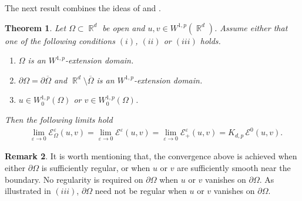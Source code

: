 \documentclass[12pt, reqno]{amsart}%
\theoremstyle{plain}  %
\newtheorem{theorem}{Theorem}[section]
\theoremstyle{definition}  %
\newtheorem{remark}[theorem]{Remark}   %
\numberwithin{equation}{section}
\DeclareMathOperator{\R}{\mathbb{R}}
\newcommand{\eps}{\varepsilon}
\begin{document}
\noindent The next result combines the ideas of \cite[Theorem 1.5]{Fog23} and \cite[Lemma 2.8]{FeSa20}.
\begin{theorem}\label{thm:BBM-dual-limit}  Let $\Omega\subset \R^d$ be open and $u,v\in W^{1,p}(\R^d)$.
Assume either that one of the following conditions $(i)$,  $(ii)$ or $(iii)$ holds.
\begin{enumerate}[$(i)$]
\item $\Omega$ is an $W^{1,p}$-extension domain.
\item $\partial \Omega=\partial\overline{\Omega}$ and  $\R^d\setminus \overline{\Omega}$ is an $W^{1,p}$-extension domain.
\item $u\in W^{1,p}_0(\Omega)$ or $v\in W^{1,p}_0(\Omega)$.
\end{enumerate}
Then the following limits hold
%
\begin{align}
&\lim_{\eps\to0}\mathcal{E}^{\eps}_{\Omega}(u,v)
=\lim_{\eps\to0}\mathcal{E}^{\eps}(u,v) = \lim_{\eps\to0}\mathcal{E}^{\eps}_+(u,v) = K_{d,p}\,\mathcal{E}^{0}(u,v). \label{eq:form-conv-plus}
\end{align}
\end{theorem}
\begin{remark}
It is worth mentioning that, the convergence above is achieved when either $\partial\Omega$ is sufficiently regular, or when  $u$ or $v$ are sufficiently smooth near the boundary. No regularity is required on $\partial\Omega$ when $u$ or $v$ vanishes on  $\partial\Omega$.
As illustrated in $(iii)$,  $\partial\Omega$  need not be regular when $u$ or $v$ vanishes on  $\partial\Omega$.
\end{remark}
\end{document}
